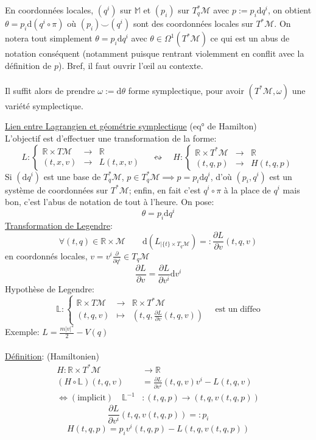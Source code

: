 \documentclass[a4paper,11pt]{article}
\renewcommand{\d}{{\mathrm{d}}}
\newcommand{\dr}[2]{\frac{\partial {#1}}{\partial{#2}}}
\begin{document}
En coordonnées locales, $(q^i)$ sur $\mathbb{M}$ et $(p_i)$ sur $T_q^*\mathcal{M}$ avec $p := p_i \d q^i$, on obtient $\theta = p_i \d \left(q^i\circ \pi\right)$ où $(p_i)\!\!\smile\!\!(q^i)$ sont des coordonnées locales sur $T^*\mathcal{M}$. On notera tout simplement $\theta = p_i\d q^i$ avec $\theta \in \Omega^1(T^*\mathcal{M})$
ce qui est un abus de notation conséquent (notamment puisque rentrant violemment en conflit avec la définition de $p$). Bref, il faut ouvrir l'œil au contexte.\\
\\
Il suffit alors de prendre $\omega := \d \theta$ forme symplectique, pour avoir $(T^*\mathcal{M},\omega)$ une variété symplectique.

\noindent \underline{Lien entre Lagrangien et géométrie symplectique} (eq° de Hamilton)\\
L'objectif est d'effectuer une transformation de la forme:
\begin{equation*}
L: \left\{ \begin{matrix}
\mathbb{R}\times T \mathcal{M} & \to & \mathbb{R}\\
(t,x,v) & \to & L(t,x,v)
\end{matrix}\right.
\quad \leftrightsquigarrow \quad H:\left\{\begin{matrix}
\mathbb{R}\times T^* \mathcal{M} & \to & \mathbb{R}\\
(t,q,p) & \to & H(t,q,p)
\end{matrix}\right.
\end{equation*}
Si $(\d q^i)$ est une base de $T_q^*\mathcal{M}$, $p\in T^*_q\mathcal{M} \implies p=p_i\d q^i$, d'où $(p_i, q^i)$ est un système de coordonnées sur $T^*\mathcal{M}$; enfin, en fait c'est $q^i\circ \pi$ à la place de $q^i$ mais bon, c'est l'abus de notation de tout à l'heure. On pose:
$$\theta = p_i\d q^i$$
\underline{Transformation de Legendre}:
$$\forall (t,q) \in \mathbb{R}\times\mathcal{M}\quad\quad \d \left(L_{|\{t\}\times T_q\mathcal{M}}\right) =: \dr{L}{v}(t,q,v)$$
en coordonnés locales, $v=v^i\frac{\partial}{\partial q^i} \in T_q\mathcal{M}$
$$\dr{L}{v} = \dr{L}{v^i} \d v^i$$
Hypothèse de Legendre: 
\begin{equation*}
\mathbb{L}: \left\{\begin{matrix}
\mathbb{R}\times T\mathcal{M} & \to & \mathbb{R}\times T^*\mathcal{M}\\
(t,q,v) & \mapsto & (t,q, \dr{L}{v}(t,q,v))
\end{matrix}\right. \quad \mathrm{est}\; \mathrm{un}\; \mathrm{diffeo}
\end{equation*}
Exemple: $L = \frac{m |v|^2}{2} - V(q)$\\
\\
\underline{Définition}: (Hamiltonien)
\begin{align*}
H : \mathbb{R}\times T^*\mathcal{M} &\to \mathbb{R}\\
(H\circ\mathbb{L})(t,q,v) &= \dr{L}{v^i}(t,q,v) v^i - L(t,q,v)\\
\iff (\mathrm{implicit})\quad  \mathbb{L}^{-1}&: (t,q,p)\to (t,q,v(t,q,p))
\end{align*}
$$\dr{L}{v^i}(t,q,v(t,q,p)) =: p_i $$
$$H(t,q,p) = p_i v^i(t,q,p) - L(t,q,v(t,q,p))$$
\end{document}
